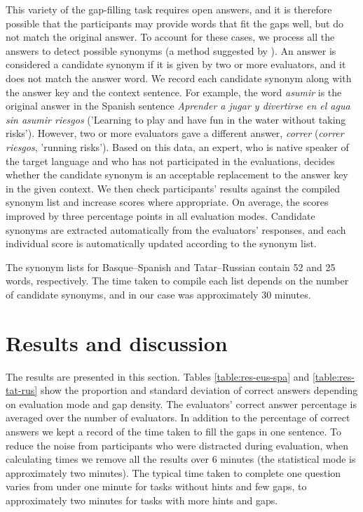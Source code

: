 \documentclass[11pt]{article}
\begin{document}
This variety of the gap-filling task requires open answers, and it is therefore possible that the participants may
provide words that fit the gaps well, but do not match the original answer. To account for
these cases, we process all the answers to detect possible synonyms (a method suggested by \cite{oregan13}). An answer is
considered a candidate synonym if it is given by two or more evaluators, and it does not match
the answer word. We record each candidate synonym along with the answer key and the
context sentence. For example, the word \emph{asumir} is the original answer in the Spanish sentence \emph{Aprender a jugar y divertirse en el agua sin asumir riesgos} ('Learning to play and have fun in the water without taking risks'). However, two or more evaluators gave a different answer, \emph{correr} (\emph{correr riesgos}, 'running risks'). Based on this data, an expert, who is native speaker of the target language and who has not participated in the evaluations, decides
whether the candidate synonym is an acceptable replacement to the answer key in the given
context. We then check participants' results against the compiled synonym list and
increase scores where appropriate. On average, the scores improved by three percentage points in all evaluation modes. Candidate synonyms are extracted automatically from the evaluators' responses,  and each individual score is automatically updated according to the synonym list.

The synonym lists for Basque--Spanish and Tatar--Russian contain 52 and 25 words, respectively. The time taken to compile each list depends on the number of candidate synonyms, and in our case was approximately 30 minutes. 

\section{Results and discussion}
\label{sec:results}

The results are presented in this section. Tables \ref{table:res-eus-spa} and \ref{table:res-tat-rus} 
show
the proportion and standard deviation of correct answers depending on evaluation mode and gap density.
The evaluators' correct answer percentage is averaged over the number of evaluators. In addition to the percentage of correct answers we kept a record of the time taken to fill the gaps in one sentence. To reduce the noise from participants who were distracted during evaluation, when
calculating times we remove all the results over 6 minutes (the statistical mode is approximately
two minutes). The typical time taken to complete one question varies from under one minute for tasks without hints and few gaps, to approximately two minutes for tasks with more hints and gaps. 
\end{document}
